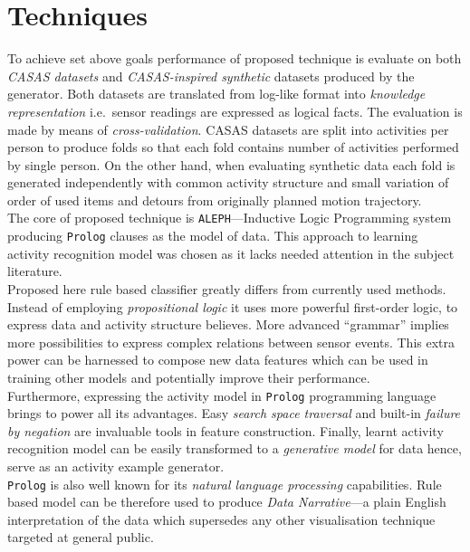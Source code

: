 \documentclass[12pt, a4paper, pdflatex, leqno, twoside, openright]{report}
\begin{document}
\section{Techniques}
To achieve set above goals performance of proposed technique is evaluate on both \emph{CASAS datasets} and \emph{CASAS-inspired synthetic} datasets produced by the generator. Both datasets are translated from log-like format into \emph{knowledge representation} i.e.\ sensor readings are expressed as logical facts. The evaluation is made by means of \emph{cross-validation}. CASAS datasets are split into activities per person to produce folds so that each fold contains number of activities performed by single person. On the other hand, when evaluating synthetic data each fold is generated independently with common activity structure and small variation of order of used items and detours from originally planned motion trajectory.\\

The core of proposed technique is \texttt{ALEPH}---Inductive Logic Programming system producing \texttt{Prolog} clauses as the model of data. This approach to learning activity recognition model was chosen as it lacks needed attention in the subject literature.\\

Proposed here rule based classifier greatly differs from currently used methods. Instead of employing \emph{propositional logic} it uses more powerful first-order logic, to express data and activity structure believes. More advanced ``grammar'' implies more possibilities to express complex relations between sensor events. This extra power can be harnessed to compose new data features which can be used in training other models and potentially improve their performance.\\

Furthermore, expressing the activity model in \texttt{Prolog} programming language brings to power all its advantages. Easy \emph{search space traversal} and built-in \emph{failure by negation} are invaluable tools in feature construction. Finally, learnt activity recognition model can be easily transformed to a \emph{generative model} for data hence, serve as an activity example generator.\\
\texttt{Prolog} is also well known for its \emph{natural language processing} capabilities. Rule based model can be therefore used to produce \emph{Data Narrative}---a plain English interpretation of the data which supersedes any other visualisation technique targeted at general public.\\
\end{document}
